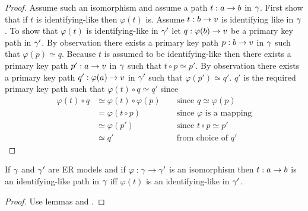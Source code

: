 \begin{proof}
Assume such an isomorphism and assume a path $t: a \rightarrow b$ in $\gamma$. 
First show that if $t$ is identifying-like then $\varphi(t)$ is. Assume $t: b \rightarrow v$ is identifying like in $\gamma$. To show that $\varphi(t)$
is identifying-like in $\gamma'$ let $q : \varphi(b) \rightarrow v$ be a primary key path in $\gamma'$. By observation  there exists a primary key path $p : b \rightarrow v$ in $\gamma$ such that $\varphi(p) \simeq q$. Because $t$ is assumed to be identifying-like then there exists a primary key path $p': a  \rightarrow  v$ in $\gamma$ such that $t \circ p \simeq p'$. By observation there exists a primary key path $q' : \varphi(a)  \rightarrow  v$ in $\gamma'$
such that $\varphi(p') \simeq q'$. $q'$ is the required primary key path such that $\varphi(t) \circ q \simeq q'$ since
\begin{align*}
\varphi(t) \circ q  & \simeq \varphi(t) \circ \varphi(p)       && \mbox{ since $q \simeq \varphi(p)$}    \\
                    & =      \varphi(t \circ  p)                && \mbox{ since $\varphi$ is a mapping} \\
                    & \simeq \varphi(p')                        && \mbox{ since $t \circ p \simeq p'$}           \\
                    & \simeq q'                                 && \mbox{ from choice of $q'$}   
\end{align*}
\end{proof}

\begin{lemma}
If $\gamma$ and $\gamma'$ are ER models and if $\varphi:\gamma \rightarrow \gamma'$ is an isomorphism then $t: a  \rightarrow  b$ is an identifying-like path in $\gamma$ iff $\varphi(t)$ is an identifying-like in $\gamma'$.
\end{lemma}
\begin{proof}
Use lemmas  and .
\end{proof}

